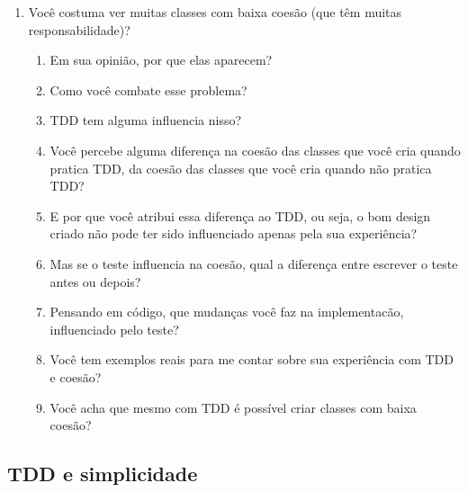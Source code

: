 \begin{enumerate}
	\item{Você costuma ver muitas classes com baixa coesão (que têm muitas responsabilidade)?}
		\begin{enumerate}
			\item Em sua opinião, por que elas aparecem?

			\item Como você combate esse problema?

			\item TDD tem alguma influencia nisso?
			
			\item Você percebe alguma diferença na coesão das classes que você cria quando
			pratica TDD, da coesão das classes que você cria quando não pratica TDD?
			
			\item E por que você atribui essa diferença ao TDD, ou seja, o bom design
			criado não pode ter sido influenciado apenas pela sua experiência?
			
			\item Mas se o teste influencia na coesão, 
			qual a diferença entre escrever o teste antes ou depois?
			
			\item Pensando em código, que mudanças você faz na implementacão, influenciado
			pelo teste?
			
			\item Você tem exemplos reais para me contar sobre sua experiência com TDD e 
			coesão?

			\item Você acha que mesmo com TDD é possível criar classes com baixa coesão? 

		\end{enumerate}
\end{enumerate}

\subsection{TDD e simplicidade}
\label{entrevista:simplicidade}

